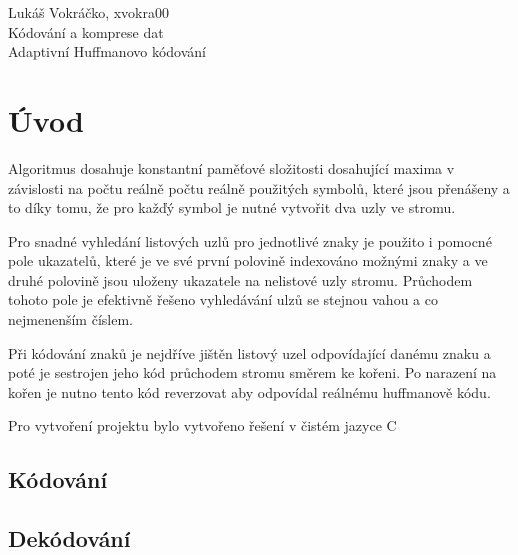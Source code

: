 \documentclass[12pt,a4paper,titlepage,final]{article}
\begin{document}
\newpage

\def\name{Lukáš Vokráčko}
\def\login{xvokra00}
\def\subject{Kódování a komprese dat}
\def\project{Adaptivní Huffmanovo kódování}


{
	\pagestyle{empty}
	
	\tableofcontents
	\newpage
	\pagestyle{plain}
}
{
	\pagestyle{plain}
	\vspace*{5px}
	\hfill \name, \login \\
	\vspace*{5px}
	{\LARGE \subject}  \\
	{\LARGE \project}  \\
}

\setcounter{page}{1}

\section{Úvod}
	Algoritmus dosahuje konstantní paměťové složitosti dosahující maxima v závislosti na počtu reálně počtu reálně
	použitých symbolů, které jsou přenášeny a to díky tomu, že pro kažďý symbol je nutné vytvořit dva uzly ve stromu.
	
	Pro snadné vyhledání listových uzlů pro jednotlivé znaky je použito i pomocné pole ukazatelů,
	které je ve své první polovině indexováno možnými znaky a ve druhé polovině jsou uloženy ukazatele
	na nelistové uzly stromu.
	Průchodem tohoto pole je efektivně řešeno vyhledávání ulzů se stejnou vahou a co nejmenenším číslem.

	Při kódování znaků je nejdříve jištěn listový uzel odpovídající danému znaku a poté je sestrojen
	jeho kód průchodem stromu směrem ke kořeni. Po narazení na kořen je nutno tento kód reverzovat aby odpovídal reálnému 
	huffmanově kódu.

	Pro vytvoření projektu bylo vytvořeno řešení v čistém jazyce C
\subsection{Kódování}


\subsection{Dekódování}
\end{document}
